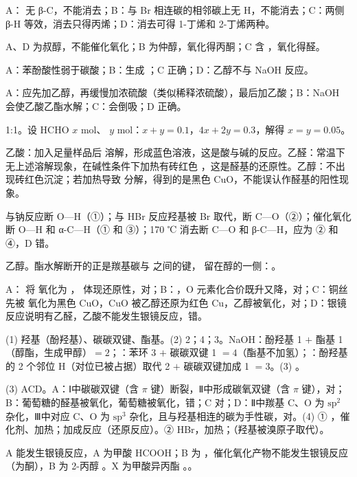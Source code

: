 \begin{jiexilist}
\item {}A： 无 β-C，不能消去；B：与 Br 相连碳的相邻碳上无 H，不能消去；C：两侧 β-H 等效，消去只得丙烯；D：消去可得 1-丁烯和 2-丁烯两种。
\item {}A、D 为叔醇，不能催化氧化；B 为仲醇，氧化得丙酮；C 含 ，氧化得醛。
\item {}A：苯酚酸性弱于碳酸；B：生成 ；C 正确；D：乙醇不与 NaOH 反应。
\item {}A：应先加乙醇，再缓慢加浓硫酸（类似稀释浓硫酸），最后加乙酸；B：NaOH 会使乙酸乙酯水解；C：会倒吸；D 正确。
\item 1:1。设 HCHO $x$ mol、 $y$ mol：$x+y=0.1$，$4x+2y=0.3$，解得 $x=y=0.05$。
\item 乙酸：加入足量样品后  溶解，形成蓝色溶液，这是酸与碱的反应。乙醛：常温下无上述溶解现象，在碱性条件下加热有砖红色 ，这是醛基的还原性。乙醇：不出现砖红色沉淀；若加热导致  分解，得到的是黑色 CuO，不能误认作醛基的阳性现象。
\item {}与钠反应断 O—H（①）；与 HBr 反应羟基被 Br 取代，断 C—O（②）；催化氧化断 O—H 和 α-C—H（① 和 ③）；170 ℃ 消去断 C—O 和 β-C—H，应为 ② 和 ④，D 错。
\item 乙醇。酯水解断开的正是羰基碳与  之间的键， 留在醇的一侧：。
\item {}A： 将  氧化为 ， 体现还原性，对；B：，O 元素化合价既升又降，对；C：铜丝先被  氧化为黑色 CuO，CuO 被乙醇还原为红色 Cu，乙醇被氧化，对；D：银镜反应说明有乙醛，乙酸不能发生银镜反应，错。
\item (1) 羟基（酚羟基）、碳碳双键、酯基。(2) 2；4；3。NaOH：酚羟基 1 $+$ 酯基 1（醇酯，生成甲醇）$=2$；：苯环 3 $+$ 碳碳双键 1 $=4$（酯基不加氢）；：酚羟基的 2 个邻位 H（对位已被占据）取代 2 $+$ 碳碳双键加成 1 $=3$。(3) 。
\item (3) ACD。A：Ⅰ中碳碳双键（含 $\pi$ 键）断裂，Ⅱ中形成碳氧双键（含 $\pi$ 键），对；B：葡萄糖的醛基被氧化，葡萄糖被氧化，错；C 对；D：Ⅱ中羰基 C、O 为 $\mathrm{sp}^2$ 杂化，Ⅲ中对应 C、O 为 $\mathrm{sp}^3$ 杂化，且与羟基相连的碳为手性碳，对。(4) ① ，催化剂、加热；加成反应（还原反应）。② HBr，加热；（羟基被溴原子取代）。
\item A 能发生银镜反应，A 为甲酸 HCOOH；B 为 ，催化氧化产物不能发生银镜反应（为酮），B 为 2-丙醇 。X 为甲酸异丙酯 。。

\end{jiexilist}

